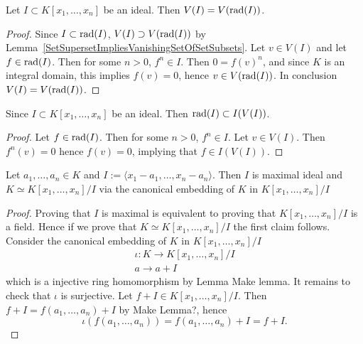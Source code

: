 \begin{lemma}\label{VanishingSetOfIdealIsVanishingSetOfRadical}
    Let $I\subset K[x_1,\dots,x_n]$ be an ideal. Then $V(I)=V(\mathrm{rad}(I))$.
\end{lemma}
\begin{proof}
    Since $I\subset \mathrm{rad}(I)$, $V(I)\supset V(\mathrm{rad}(I))$ by Lemma~\ref{SetSupersetImpliesVanishingSetOfSetSubsets}. Let $v \in V(I)$ and let $f\in \mathrm{rad}(I)$. Then for some $n>0$, $f^n\in I$. Then $0=f(v)^n$, and since $K$ is an integral domain, this implies $f(v)=0$, hence $v\in V(\mathrm{rad}(I))$. In conclusion $V(I) = V(\mathrm{rad}(I))$.
\end{proof}
\begin{lemma}\label{RadicalIsSubsetOfIdealOfVanishingSetOfIdeal}
    Since $I\subset K[x_1,\dots,x_n]$ be an ideal. Then $\mathrm{rad}(I) \subset I(V(I))$.
\end{lemma}
\begin{proof}
    Let $f \in \mathrm{rad}(I)$. Then for some $n>0$, $f^n\in I$. Let $v\in V(I)$. Then $f^n(v)=0$ hence $f(v)=0$, implying that $f\in I(V(I))$.
\end{proof}

\begin{lemma}
    Let $a_1,\dots,a_n\in K$ and $I :=\langle x_1-a_1,\dots,x_n-a_n\rangle$. Then $I$ is maximal ideal and $K \simeq K[x_1,\dots,x_n]/I$ via the canonical embedding of $K$ in $K[x_1,\dots,x_n]/I$
\end{lemma}
\begin{proof}
    Proving that $I$ is maximal is equivalent to proving that $K[x_1,\dots,x_n]/I$ is a field. Hence if we prove that $K\simeq K[x_1,\dots,x_n]/I$ the first claim follows. Consider the canonical embedding of $K$ in $K[x_1,\dots,x_n]/I$ 
    \begin{gather*}
        \iota : K \rightarrow K[x_1,\dots,x_n]/I\\
        a \rightarrow a + I
    \end{gather*}
    which is a injective ring homomorphism by Lemma {\Large Make lemma}. It remains to check that $\iota$ is surjective. Let $f + I \in K[x_1,\dots,x_n]/I$. Then $f + I = f(a_1,\dots,a_n) +I$ by {\Large Make Lemma?}, hence 
    $$\iota(f(a_1,\dots,a_n))= f(a_1,\dots,a_n) + I = f + I.$$
\end{proof}
